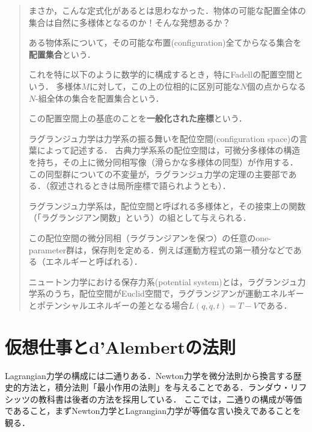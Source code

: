 \documentclass[uplatex, 12pt, dvipdfmx]{jsreport}
\begin{document}
\begin{quotation}
    まさか，こんな定式化があるとは思わなかった．物体の可能な配置全体の集合は自然に多様体となるのか！そんな発想あるか？
    \begin{definition}
        ある物体系について，その可能な布置(configuration)全てからなる集合を\textbf{配置集合}という．

        これを特に以下のように数学的に構成するとき，特にFadellの配置空間という．
        多様体$M$に対して，この上の位相的に区別可能な$N$個の点からなる$N$-組全体の集合を配置集合という．

        この配置空間上の基底のことを\textbf{一般化された座標}という．
    \end{definition}
    ラグランジュ力学は力学系の振る舞いを配位空間(configuration space)の言葉によって記述する．
    古典力学系系の配位空間は，可微分多様体の構造を持ち，その上に微分同相写像（滑らかな多様体の同型）が作用する．
    この同型群についての不変量が，ラグランジュ力学の定理の主要部である．（叙述されるときは局所座標で語られようとも）．

    ラグランジュ力学系は，配位空間と呼ばれる多様体と，その接束上の関数（「ラグランジアン関数」という）の組として与えられる．

    この配位空間の微分同相（ラグランジアンを保つ）の任意のone-parameter群は，保存則を定める．例えば運動方程式の第一積分などである（エネルギーと呼ばれる）．

    ニュートン力学における保存力系(potential system)とは，ラグランジュ力学系のうち，配位空間がEuclid空間で，ラグランジアンが運動エネルギーとポテンシャルエネルギーの差となる場合$L(q,\dot{q},t)=T-V$である．
\end{quotation}

\section{仮想仕事とd'Alembertの法則}

\begin{screen}
    Lagrangian力学の構成には二通りある．Newton力学を微分法則から換言する歴史的方法と，積分法則「最小作用の法則」を与えることである．ランダウ・リフシッツの教科書は後者の方法を採用している．
    ここでは，二通りの構成が等価であること，まずNewton力学とLagrangian力学が等価な言い換えであることを観る．
\end{screen}
\end{document}

